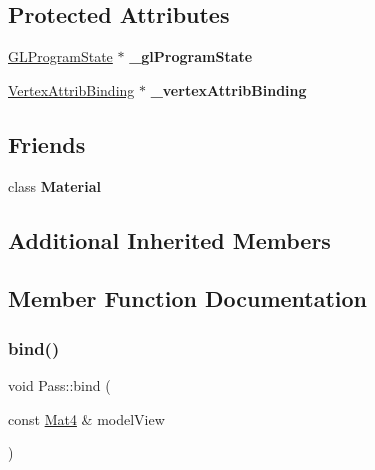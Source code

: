 \subsection*{Protected Attributes}
\begin{DoxyCompactItemize}
\item 
\mbox{\label{classPass_ad3eedb6c2d860f9ce26008ee8c3d9f15}} 
\hyperlink{classGLProgramState}{G\+L\+Program\+State} $\ast$ {\bfseries \+\_\+gl\+Program\+State}
\item 
\mbox{\label{classPass_a48555eb21cbbb5a2249423ffda0d549d}} 
\hyperlink{classVertexAttribBinding}{Vertex\+Attrib\+Binding} $\ast$ {\bfseries \+\_\+vertex\+Attrib\+Binding}
\end{DoxyCompactItemize}
\subsection*{Friends}
\begin{DoxyCompactItemize}
\item 
\mbox{\label{classPass_a76b09dbbfd6aad2807be6181db6bd2e4}} 
class {\bfseries Material}
\end{DoxyCompactItemize}
\subsection*{Additional Inherited Members}


\subsection{Member Function Documentation}
\mbox{\label{classPass_a61f3c6e7b46c51555c43d97619a13630}} 
\subsubsection{\texorpdfstring{bind()}{bind()}\hspace{0.1cm}{\footnotesize\ttfamily [1/2]}}
{\footnotesize\ttfamily void Pass\+::bind (\begin{DoxyParamCaption}\item[{const \hyperlink{classMat4}{Mat4} \&}]{model\+View }\end{DoxyParamCaption})}

